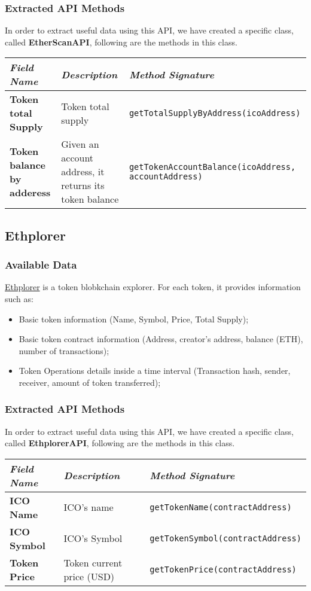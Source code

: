 \subsubsection{Extracted API Methods}
In order to extract useful data using this API, we have created a specific class, called \textbf{EtherScanAPI}, following are the methods in this class.
\begin{center}
\begin{tabular}{| C{2cm} | C{4cm} | C{7cm} |} \hline
    \textit{Field Name} & \textit{Description} & \textit{Method Signature}\\ \hline 
    \textbf{Token total Supply } & Token total supply &
    \texttt{getTotalSupplyByAddress(icoAddress)}\\ \hline
    \textbf{Token balance by adderess} & Given an account address, it returns its token balance &
    \texttt{getTokenAccountBalance(icoAddress, accountAddress)}\\ \hline
\end{tabular}
\end{center}

\subsection{Ethplorer}
\subsubsection{Available Data}
\href{https://ethplorer.io/}{Ethplorer} is a token blobkchain explorer. For each token, it provides information such as:
\begin{itemize}
    \item Basic token information (Name, Symbol, Price, Total Supply);
    \item Basic token contract information (Address, creator's address, balance (ETH), number of transactions);
    \item Token Operations details inside a time interval (Transaction hash, sender, receiver, amount of token transferred);
\end{itemize}
\subsubsection{Extracted API Methods}
In order to extract useful data using this API, we have created a specific class, called \textbf{EthplorerAPI}, following are the methods in this class.
\begin{center}
\begin{tabular}{| C{2cm} | C{4cm} | C{7cm} |} \hline
    \textit{Field Name} & \textit{Description} & \textit{Method Signature}\\ \hline
    \textbf{ICO Name} & ICO's name & \texttt{getTokenName(contractAddress)}\\ \hline 
    \textbf{ICO Symbol} & ICO's Symbol & \texttt{getTokenSymbol(contractAddress)}\\ \hline 
    \textbf{Token Price} & Token current price (USD) & \texttt{getTokenPrice(contractAddress)}\\ \hline
\end{tabular}
\end{center}

